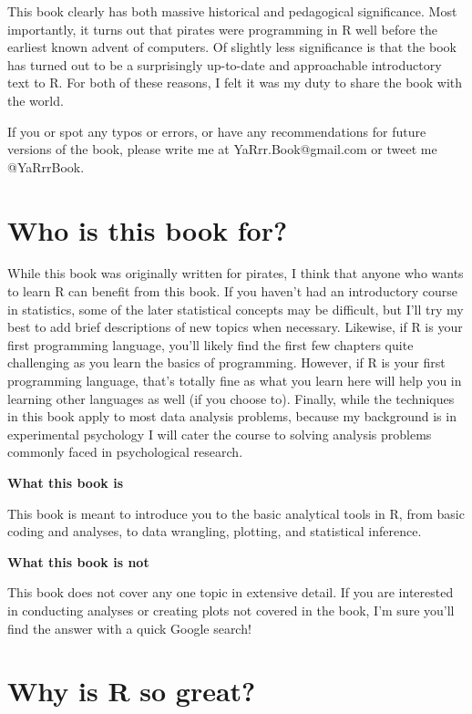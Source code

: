 \documentclass[]{book}
\theoremstyle{definition}
\theoremstyle{definition}
\theoremstyle{remark}
\begin{document}
This book clearly has both massive historical and pedagogical
significance. Most importantly, it turns out that pirates were
programming in R well before the earliest known advent of computers. Of
slightly less significance is that the book has turned out to be a
surprisingly up-to-date and approachable introductory text to R. For
both of these reasons, I felt it was my duty to share the book with the
world.

If you or spot any typos or errors, or have any recommendations for
future versions of the book, please write me at YaRrr.Book@gmail.com or
tweet me @YaRrrBook.

\section{Who is this book for?}\label{who-is-this-book-for}

While this book was originally written for pirates, I think that anyone
who wants to learn R can benefit from this book. If you haven't had an
introductory course in statistics, some of the later statistical
concepts may be difficult, but I'll try my best to add brief
descriptions of new topics when necessary. Likewise, if R is your first
programming language, you'll likely find the first few chapters quite
challenging as you learn the basics of programming. However, if R is
your first programming language, that's totally fine as what you learn
here will help you in learning other languages as well (if you choose
to). Finally, while the techniques in this book apply to most data
analysis problems, because my background is in experimental psychology I
will cater the course to solving analysis problems commonly faced in
psychological research.

\textbf{What this book is}

This book is meant to introduce you to the basic analytical tools in R,
from basic coding and analyses, to data wrangling, plotting, and
statistical inference.

\textbf{What this book is not}

This book does not cover any one topic in extensive detail. If you are
interested in conducting analyses or creating plots not covered in the
book, I'm sure you'll find the answer with a quick Google search!

\section{Why is R so great?}\label{why-is-r-so-great}
\end{document}
